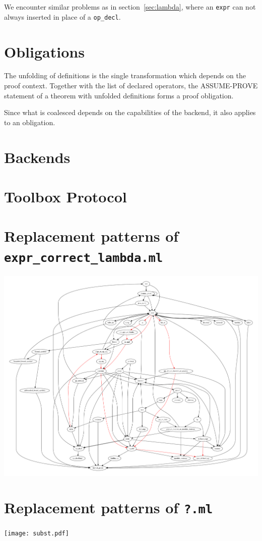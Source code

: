 \documentclass[10pt,a4paper]{article}
\newcommand{\filename}[1]{\texttt{#1}}
\newcommand{\datatype}[1]{\texttt{#1}}
\newcommand{\dtopdecl}{\datatype{op\_decl}}
\newcommand{\dtexpr}{\datatype{expr}}
\begin{document}
We encounter similar problems as in section~\ref{sec:lambda}, where an
 \dtexpr{} can not always inserted in place of a \dtopdecl{}.


\section{Obligations}
\label{sec:obligations}

The unfolding of definitions is the single transformation which depends on the
 proof context. Together with the list of declared operators, the ASSUME-PROVE
 statement of a theorem with unfolded definitions forms a proof obligation.

Since what is coalesced depends on the capabilities of the backend, it also
 applies to an obligation.

\section{Backends}
\label{sec:backends}

\section{Toolbox Protocol}
\label{sec:protocol}


\appendix

\section{Replacement patterns of \filename{expr\_correct\_lambda.ml}}
\label{app:lambda}
\includegraphics[angle=90,width=\textwidth]{lambda.pdf}

\section{Replacement patterns of \filename{?.ml}}
\label{app:lambda}
\texttt{[image: subst.pdf]}
\end{document}
